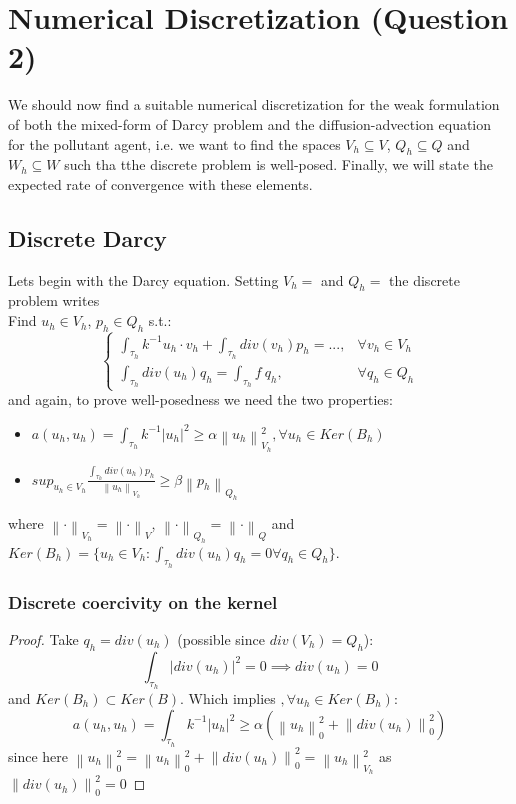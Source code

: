 \documentclass[conference]{IEEEtran}
\newcommand{\norm}[1]{\left\lVert#1\right\rVert}
\begin{document}
\section{Numerical Discretization (Question 2)}
We should now find a suitable numerical discretization for the weak formulation of both the mixed-form of Darcy problem and the diffusion-advection equation for the pollutant agent, i.e. we want to find the spaces $V_h \subseteq V$, $Q_h \subseteq Q$ and  $W_h \subseteq W$ such tha tthe discrete problem is well-posed. Finally, we will state the expected rate of convergence with these elements.


\subsection{Discrete Darcy}
Lets begin with the Darcy equation. Setting $V_h=$ and $Q_h=$ the discrete problem writes\\
Find $u_h \in V_h$, $p_h \in Q_h$ s.t.:
\begin{equation}
	\begin{cases}
		\int_{\tau_h} k^{-1} u_h \cdot v_h + \int_{\tau_h} div(v_h) p_h = ... ,&\forall v_h \in V_h \\
		\int_{\tau_h} div(u_h) q_h = \int_{\tau_h} f\ q_h, &\forall q_h \in Q_h
	\end{cases}
	\label{eq:DDarcy}
\end{equation}
and again, to prove well-posedness we need the two properties:
\begin{itemize}
\item $a(u_h,u_h)=\int_{\tau_h} k^{-1} |u_h|^2 \geq \alpha \norm{u_h}^2_{V_h} , \forall u_h \in Ker(B_h)$
\item $sup_{u_h \in V_h} \frac{\int_{\tau_h} div(u_h) p_h}{\norm{u_h}_{V_h}} \geq \beta \norm{p_h}_{Q_h}$
\end{itemize}
where $\norm{\cdot}_{V_h} = \norm{\cdot}_{V} $, $\norm{\cdot}_{Q_h} = \norm{\cdot}_{Q} $ and $Ker(B_h)=\{u_h \in V_h : \int_{\tau_h} div(u_h) q_h = 0 \forall q_h \in Q_h \}$.\\
\subsubsection{Discrete coercivity on the kernel}
\begin{proof}
Take $q_h = div(u_h)$ (possible since $div(V_h)=Q_h$):
$$ \int_{\tau_h} |div(u_h)|^2 = 0 \implies div(u_h) = 0 $$
and $Ker(B_h)\subset Ker(B)$.
Which implies $, \forall u_h \in Ker(B_h)$:
\begin{equation}
 a(u_h,u_h)=\int_{\tau_h} k^{-1} |u_h|^2 \geq \alpha (\norm{u_h}^2_0 + \norm{div(u_h)}^2_0)  
\end{equation}
since here $\norm{u_h}^2_0 = \norm{u_h}^2_0 + \norm{div(u_h)}^2_0 = \norm{u_h}^2_{V_h}$ as $\norm{div(u_h)}^2_0 = 0$
\end{proof}
\end{document}
